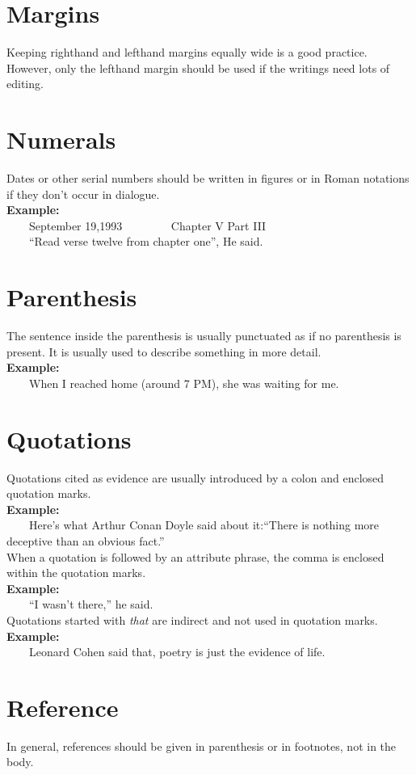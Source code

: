 \documentclass[12pt]{report}
\newcommand{\xmpl}{\textbf{Example:}\\} %
\newcommand{\indnt}{\ \ \ \ } %
\begin{document}
\section{Margins}
Keeping righthand and lefthand margins equally wide is a good practice. However, only the lefthand margin should be used if the writings need lots of editing.


\section{Numerals}
Dates or other serial numbers should be written in figures or in Roman notations if they don't occur in dialogue.\\
\xmpl
\indnt September 19,1993 \indnt \indnt Chapter V Part III\\
\indnt ``Read verse twelve from chapter one'', He said.


\section{Parenthesis}
The sentence inside the parenthesis is usually punctuated as if no parenthesis is present. It is usually used to describe something in more detail.\\
\xmpl
\indnt When I reached home (around 7 PM), she was waiting for me.


\section{Quotations}
Quotations cited as evidence are usually introduced by a colon and enclosed quotation marks.\\
\xmpl
\indnt Here's what Arthur Conan Doyle said about it:``There is nothing more deceptive than an obvious fact.''\\
When a quotation is followed by an attribute phrase, the comma is enclosed within the quotation marks.\\
\xmpl
\indnt ``I wasn't there,'' he said.\\
Quotations started with \textit{that} are indirect and not used in quotation marks.\\
\xmpl
\indnt Leonard Cohen said that, poetry is just the evidence of life.\\


\section{Reference}
In general, references should be given in parenthesis or in footnotes, not in the body.
\end{document}
